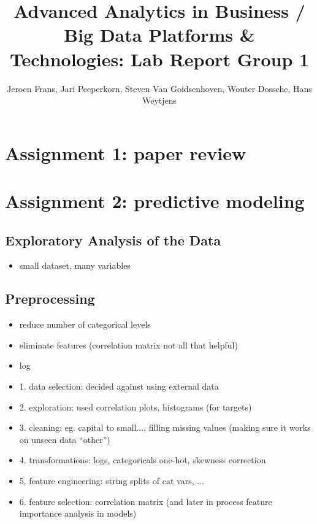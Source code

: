\documentclass[a4paper,11pt]{article}
\title{\textbf{Advanced Analytics in Business / Big Data Platforms \& Technologies: Lab Report Group 1}}
\author{Jeroen Frans, Jari Peeperkorn, Steven Van Goidsenhoven, Wouter Dossche, Hans Weytjens}
\begin{document}
\maketitle

\section{Assignment 1: paper review}


\pagebreak
\section{Assignment 2: predictive modeling}

\subsection{Exploratory Analysis of the Data}
\begin{itemize}
\item small dataset, many variables
\end{itemize}

\subsection{Preprocessing}
\begin{itemize}
\item reduce number of categorical levels
\item eliminate features (correlation matrix not all that helpful)
\item log
\item 1. data selection: decided against using external data
\item 2. exploration: used correlation plots, histograms (for targets)
\item 3. cleaning: eg. capital to small..., filling missing values (making sure it works on unseen data ``other'')
\item 4. transformations: logs, categoricals one-hot, skewness correction
\item 5. feature engineering: string splits of cat vars, ...
\item 6. feature selection: correlation matrix (and later in process feature importance analysis in models)
\end{itemize}
\end{document}
